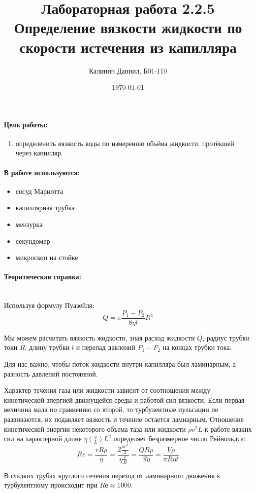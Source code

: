 \documentclass[a4paper, 12pt]{article}
\author{Калинин Даниил, Б01-110}
\date{\today}
\title{Лабораторная работа 2.2.5\\Определение вязкости жидкости по скорости истечения из капилляра}
\newcommand{\parag}[1]{\paragraph*{#1:}}
\begin{document}
\maketitle

\parag {Цель работы}
\begin{enumerate}
    \item определенить вязкость воды по измерению объёма жидкости, протёкшей через капилляр.
\end{enumerate}

\parag {В работе используются}
\begin{itemize}
    \item сосуд Мариотта
    \item капиллярная трубка
    \item мензурка
    \item секундомер
    \item микроскоп на стойке
\end{itemize}

\parag {Теоритическая справка} ~\\
Используя формулу Пуазейля:
    \begin{equation}
        Q = \pi \frac{P_1-P_2}{8 \eta l} R^4
        \label{eq:Puaz}
    \end{equation}

Мы можем расчитать вязкость жидкости, зная расход жидкости $Q$, радиус трубки токи $R$, длину трубки $l$ и перепад давлений $P_1 - P_2$ на концах трубки тока. 

Для нас важно, чтобы поток жидкости внутри капилляра был ламинарным, а разность давлений постоянной. 

Характер течения газа или жидкости зависит от соотношения между кинетической зпергией движущейся среды и работой сил вязкости. Если первая величина мала по сравнению со второй, то турбулентные пульсации пе развиваются, их подавляет вязкость и течение остается ламиарным. Отношение кинетической энергии некоторого объема таза или жидкости $\rho v^2 L$ к работе вязких сил на характерной длине $\eta (\frac{v}{L}) L^2$ определяет безразмерное число Рейнольдса:
\begin{equation}
    Re = \frac{v R \rho}{\eta} = \frac{2 \frac{\rho v^2}{2}}{\eta \frac{v}{R}} = \frac{QR \rho}{S \eta} = \frac{V\rho}{\pi R \eta t}
    \label{eq:Rayan}
\end{equation}

В гладких трубах круглого сечения переход от ламинарного движения к турбулентному происходит при $Rе \approx 1000$.
\end{document}
